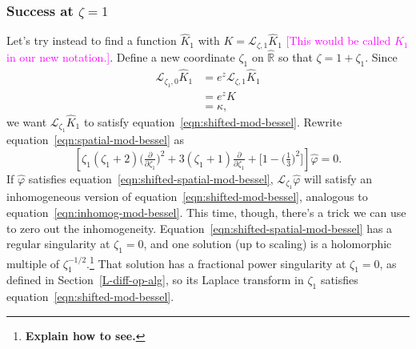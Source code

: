 \documentclass{article}
\theoremstyle{plain}
\newcommand{\R}{\mathbb{R}}
\newcommand{\laplace}{\mathcal{L}}
\begin{document}
\subsubsection{Success at $\zeta = 1$}\label{spatial-success}
Let's try instead to find a function $\hat{K}_1$ with $K = \laplace_{\zeta, 1} \hat{K}_1$ \textcolor{magenta}{[This would be called $K_1$ in our new notation.]}. Define a new coordinate $\zeta_1$ on $\hat{\R}$ so that $\zeta = 1 + \zeta_1$. Since
\begin{align*}
\laplace_{\zeta_1, 0} \hat{K}_1 & = e^z \laplace_{\zeta, 1} \hat{K}_1 \\
& = e^z K \\
& = \kappa,
\end{align*}
we want $\laplace_{\zeta_1} \hat{K}_1$ to satisfy equation~\ref{eqn:shifted-mod-bessel}. Rewrite equation~\ref{eqn:spatial-mod-bessel} as
\begin{equation}\label{eqn:shifted-spatial-mod-bessel}
\left[\zeta_1(\zeta_1 + 2) \big(\tfrac{\partial}{\partial \zeta_1}\big)^2 + 3(\zeta_1 + 1) \tfrac{\partial}{\partial \zeta_1} + \big[1 - \big(\tfrac{1}{3}\big)^2\big]\right] \hat{\varphi} = 0.
\end{equation}
If $\hat{\varphi}$ satisfies equation~\ref{eqn:shifted-spatial-mod-bessel}, $\laplace_{\zeta_1} \hat{\varphi}$ will satisfy an inhomogeneous version of equation~\ref{eqn:shifted-mod-bessel}, analogous to equation~\ref{eqn:inhomog-mod-bessel}. This time, though, there's a trick we can use to zero out the inhomogeneity. Equation~\ref{eqn:shifted-spatial-mod-bessel} has a regular singularity at $\zeta_1 = 0$, and one solution (up to scaling) is a holomorphic multiple of $\zeta_1^{-1/2}$.\footnote{\textbf{Explain how to see.}} That solution has a fractional power singularity at $\zeta_1 = 0$, as defined in Section~\ref{L-diff-op-alg}, so its Laplace transform in $\zeta_1$ satisfies equation~\ref{eqn:shifted-mod-bessel}.
\end{document}
